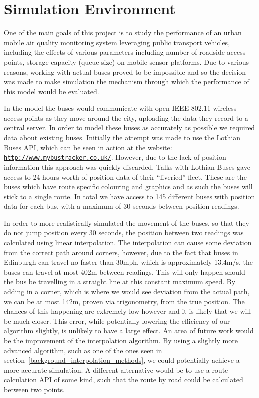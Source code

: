 \chapter{Simulation Environment}\label{simulation}
    
    One of the main goals of this project is to study the performance of an urban mobile air quality monitoring system leveraging public transport vehicles, including the effects of various parameters including number of roadside access points, storage capacity (queue size) on mobile sensor platforms. Due to various reasons, working with actual buses proved to be impossible and so the decision was made to make simulation the mechanism through which the performance of this model would be evaluated. 

    In the model the buses would communicate with open IEEE 802.11 wireless access points as they move around the city, uploading the data they record to a central server. In order to model these buses as accurately as possible we required data about existing buses. Initially the attempt was made to use the Lothian Buses API, which can be seen in action at the website: \href{http://www.mybustracker.co.uk/}{\nolinkurl{http://www.mybustracker.co.uk/}}. However, due to the lack of position information this approach was quickly discarded. Talks with Lothian Buses gave access to 24 hours worth of position data of their ``liveried'' fleet. These are the buses which have route specific colouring and graphics and as such the buses will stick to a single route. In total we have access to 145 different buses with position data for each bus, with a maximum of 30 seconds between position readings. 

    In order to more realistically simulated the movement of the buses, so that they do not jump position every 30 seconds, the position between two readings was calculated using linear interpolation. The interpolation can cause some deviation from the correct path around corners, however, due to the fact that buses in Edinburgh can travel no faster than 30mph, which is approximately 13.4m/s, the buses can travel at most 402m between readings. This will only happen should the bus be travelling in a straight line at this constant maximum speed. By adding in a corner, which is where we would see deviation from the actual path, we can be at most 142m, proven via trigonometry, from the true position. The chances of this happening are extremely low however and it is likely that we will be much closer. This error, while potentially lowering the efficiency of our algorithm slightly, is unlikely to have a large effect. An area of future work would be the improvement of the interpolation algorithm. By using a slightly more advanced algorithm, such as one of the ones seen in section~\ref{background_interpolation_methods}, we could potentially achieve a more accurate simulation. A different alternative would be to use a route calculation API of some kind, such that the route by road could be calculated between two points. 

